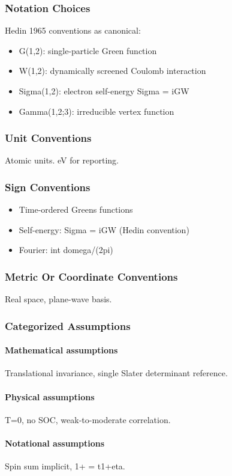\documentclass[11pt,a4paper]{article}
\begin{document}
\subsubsection*{Notation Choices}
Hedin 1965 conventions as canonical:
\begin{itemize}
\item G(1,2): single-particle Green function
\item W(1,2): dynamically screened Coulomb interaction
\item Sigma(1,2): electron self-energy Sigma = iGW
\item Gamma(1,2;3): irreducible vertex function
\end{itemize}

\subsubsection*{Unit Conventions}
Atomic units. eV for reporting.

\subsubsection*{Sign Conventions}
\begin{itemize}
\item Time-ordered Greens functions
\item Self-energy: Sigma = iGW (Hedin convention)
\item Fourier: int domega/(2pi)
\end{itemize}

\subsubsection*{Metric Or Coordinate Conventions}
Real space, plane-wave basis.

\subsubsection*{Categorized Assumptions}
\paragraph{Mathematical assumptions}
Translational invariance, single Slater determinant reference.
\paragraph{Physical assumptions}
T=0, no SOC, weak-to-moderate correlation.
\paragraph{Notational assumptions}
Spin sum implicit, 1+ = t1+eta.
\end{document}
